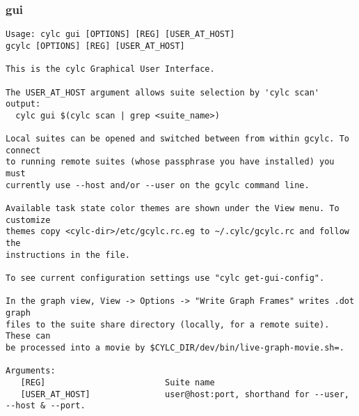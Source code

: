 \subsubsection{gui}
\label{gui}
\begin{lstlisting}
Usage: cylc gui [OPTIONS] [REG] [USER_AT_HOST]
gcylc [OPTIONS] [REG] [USER_AT_HOST]

This is the cylc Graphical User Interface.

The USER_AT_HOST argument allows suite selection by 'cylc scan' output:
  cylc gui $(cylc scan | grep <suite_name>)

Local suites can be opened and switched between from within gcylc. To connect
to running remote suites (whose passphrase you have installed) you must
currently use --host and/or --user on the gcylc command line.

Available task state color themes are shown under the View menu. To customize
themes copy <cylc-dir>/etc/gcylc.rc.eg to ~/.cylc/gcylc.rc and follow the
instructions in the file.

To see current configuration settings use "cylc get-gui-config".

In the graph view, View -> Options -> "Write Graph Frames" writes .dot graph
files to the suite share directory (locally, for a remote suite). These can
be processed into a movie by $CYLC_DIR/dev/bin/live-graph-movie.sh=.

Arguments:
   [REG]                        Suite name
   [USER_AT_HOST]               user@host:port, shorthand for --user, --host & --port.


\end{lstlisting}
